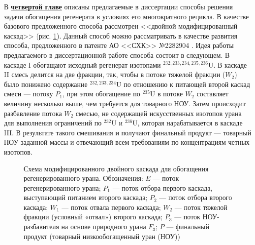 В \underline{\textbf{четвертой главе}} описаны предлагаемые в диссертации способы решения задачи обогащения регенерата в условиях его многократного рецикла.
В качестве базового предложенного способа рассмотрен <<двойной модифицированный каскад>> (рис. \ref{p2left_autoref}). Данный способ можно рассматривать в качестве развития способа, предложенного в патенте АО <<СХК>> №2282904 \cite{vodolazskihSposobIzotopnogoVosstanovleniya2006}. Идея работы предлагаемого в диссертационной работе способа состоит в следующем. В каскаде I обогащают исходный регенерат изотопами $^{232,233,234,235,236}$U. В каскаде II смесь делится на две фракции, так, чтобы в потоке тяжелой фракции ($W_2$) было понижено содержание $^{232,233,234}$U по отношению к питающей второй каскад смеси --- потоку $P_1$, при этом обогащение по $^{235}$U в потоке $W_2$ составляет величину несколько выше, чем требуется для товарного НОУ. Затем происходит разбавление потока $W_2$ смесью, не содержащей искусственных изотопов урана для выполнения ограничений по $^{232}$U и $^{236}$U, которая нарабатывается в каскаде III. В результате такого смешивания и получают финальный продукт --- товарный НОУ заданной массы и отвечающий всем требованиям по концентрациям четных изотопов. 

\begin{figure}[ht]
  \caption{Схема модифицированного двойного каскада для обогащения регенерированного урана. Обозначения: $E$ --- поток регенерированного урана; $P_1$ --- поток отбора первого каскада, выступающий питанием второго каскада; $P_2$ --- поток отбора второго каскада; $W_1$ --- поток отвала первого каскада; $W_2$ --- поток тяжелой фракции (условный «отвал») второго каскада; $P_3$ --- поток НОУ-разбавителя на основе природного урана $F_3$; $P$ --- финальный продукт (товарный низкообогащенный уран (НОУ))}\label{p2left_autoref}
\end{figure}

